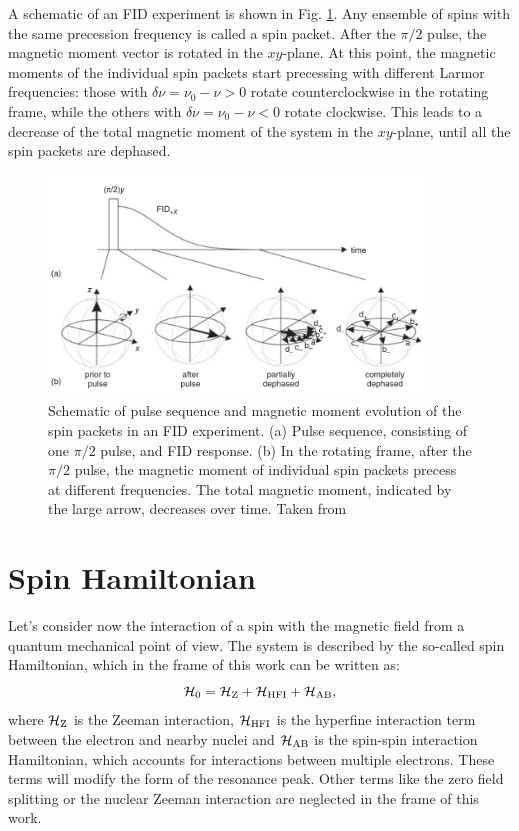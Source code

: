 \documentclass[a4paper]{book}
\newcommand{\tsub}{\textsubscript}
\begin{document}
	A schematic of an FID experiment is shown in Fig. \ref{fig:2_stoll_fid}. Any ensemble of spins with the same precession frequency is called a spin packet. After the $\pi/2$ pulse, the magnetic moment vector is rotated in the $xy$-plane. At this point, the magnetic moments of the individual spin packets start precessing with different Larmor frequencies: those with $\delta \nu = \nu_0 - \nu > 0$ rotate counterclockwise in the rotating frame, while the others with $\delta \nu = \nu_0 - \nu < 0$ rotate clockwise. This leads to a decrease of the total magnetic moment of the system in the $xy$-plane, until all the spin packets are dephased.
	\begin{figure}
		\centering
		\includegraphics[width=0.9\textwidth]{images/2_stoll_fid}
		\caption{Schematic of pulse sequence and magnetic moment evolution of the spin packets in an FID experiment. (a) Pulse sequence, consisting of one $\pi/2$ pulse, and FID response. (b) In the rotating frame, after the $\pi/2$ pulse, the magnetic moment of individual spin packets precess at different frequencies. The total magnetic moment, indicated by the large arrow, decreases over time. Taken from \cite{stollPulseEPR2017}}
		\label{fig:2_stoll_fid}
	\end{figure}
	\section{Spin Hamiltonian}
	\label{sec:2_spin_H}
	Let's consider now the interaction of a spin with the magnetic field from a quantum mechanical point of view. The system is described by the so-called spin Hamiltonian, which in the frame of this work can be written as:
	\begin{equation}
		\mathcal{H}_0 =
		\mathcal{H}\tsub{Z} + \mathcal{H}\tsub{HFI} + \mathcal{H}\tsub{AB},
		\label{eq:2_spin_H}
	\end{equation}
	where $\mathcal{H}\tsub{Z}$ is the Zeeman interaction, $\mathcal{H}\tsub{HFI}$ is the hyperfine interaction term between the electron and nearby nuclei and $\mathcal{H}\tsub{AB}$ is the spin-spin interaction Hamiltonian, which accounts for interactions between multiple electrons. These terms will modify the form of the resonance peak. Other terms like the zero field splitting or the nuclear Zeeman interaction are neglected in the frame of this work. 
	
\end{document}

